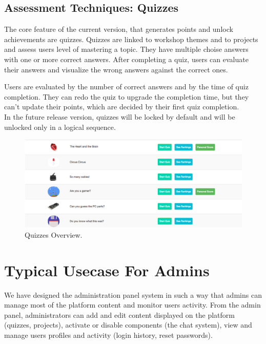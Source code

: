 \subsection{Assessment Techniques: Quizzes}

The core feature of the current version, that generates points and unlock achievements are quizzes. Quizzes are linked to workshop themes and to projects and assess users level of mastering a topic. They have multiple choise answers with one or more correct answers.
After completing a quiz, users can evaluate their answers and visualize the wrong answers against the correct ones. 

Users are evaluated by the number of correct answers and by the time of quiz completion. They can redo the quiz to upgrade the completion time, but they can't update their points, which are decided by their first quiz completion. \\

In the future release version, quizzes will be locked by default and will be unlocked only in a logical sequence. 

\begin{figure}
\includegraphics[width=1\linewidth]{images/ui/Quizzes.png}
\caption{Quizzes Overview.}
\label{fig:Quizzes}
\end{figure}

\section{Typical Usecase For Admins}

We have designed the administration panel system in such a way that admins can manage most of the platform content and monitor users activity. From the admin panel, administrators can add and edit content displayed on the platform (quizzes, projects), activate or disable components (the chat system), view and manage users profiles and activity (login history, reset passwords).\\


